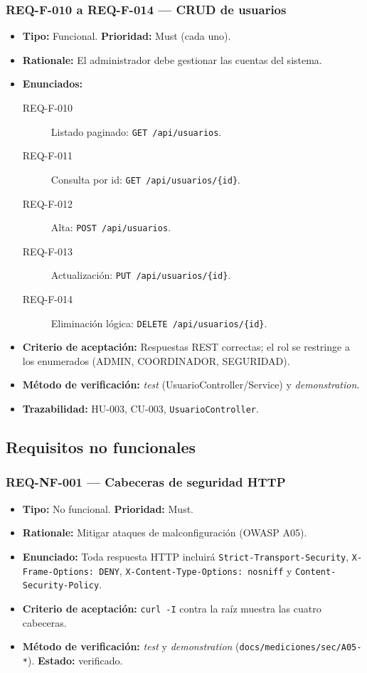\documentclass[12pt,a4paper]{article}
\begin{document}
\subsubsection{REQ-F-010 a REQ-F-014 — CRUD de usuarios}
\begin{itemize}
  \item \textbf{Tipo:} Funcional. \textbf{Prioridad:} Must (cada uno).
  \item \textbf{Rationale:} El administrador debe gestionar las cuentas del sistema.
  \item \textbf{Enunciados:}
    \begin{description}
      \item[REQ-F-010] Listado paginado: \texttt{GET /api/usuarios}.
      \item[REQ-F-011] Consulta por id: \texttt{GET /api/usuarios/\{id\}}.
      \item[REQ-F-012] Alta: \texttt{POST /api/usuarios}.
      \item[REQ-F-013] Actualización: \texttt{PUT /api/usuarios/\{id\}}.
      \item[REQ-F-014] Eliminación lógica: \texttt{DELETE /api/usuarios/\{id\}}.
    \end{description}
  \item \textbf{Criterio de aceptación:} Respuestas REST correctas; el rol se restringe a los
  enumerados (ADMIN, COORDINADOR, SEGURIDAD).
  \item \textbf{Método de verificación:} \textit{test} (UsuarioController/Service) y
  \textit{demonstration}.
  \item \textbf{Trazabilidad:} HU-003, CU-003, \texttt{UsuarioController}.
\end{itemize}

\subsection{Requisitos no funcionales}
\label{sec:rnf}

\subsubsection{REQ-NF-001 — Cabeceras de seguridad HTTP}
\begin{itemize}
  \item \textbf{Tipo:} No funcional. \textbf{Prioridad:} Must.
  \item \textbf{Rationale:} Mitigar ataques de malconfiguración (OWASP A05).
  \item \textbf{Enunciado:} Toda respuesta HTTP incluirá \texttt{Strict-Transport-Security},
  \texttt{X-Frame-Options: DENY}, \texttt{X-Content-Type-Options: nosniff} y
  \texttt{Content-Security-Policy}.
  \item \textbf{Criterio de aceptación:} \texttt{curl -I} contra la raíz muestra las cuatro
  cabeceras.
  \item \textbf{Método de verificación:} \textit{test} y \textit{demonstration}
  (\texttt{docs/mediciones/sec/A05-*}). \textbf{Estado:} verificado.
\end{itemize}
\end{document}
